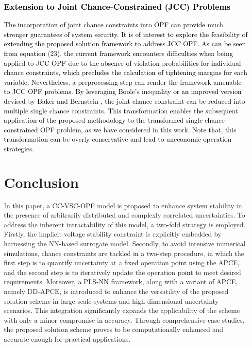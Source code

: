 \documentclass[journal]{IEEEtran}
\theoremstyle{definition}
\theoremstyle{remark}
\begin{document}
    \subsubsection{\textcolor{black}{Extension to Joint Chance-Constrained (JCC) Problems}}
    \textcolor{black}{The incorporation of joint chance constraints into OPF can provide much stronger guarantees of system security. It is of interest to explore the feasibility of extending the proposed solution framework to address JCC OPF. As can be seen from equation (23), the current framework encounters difficulties when being applied to JCC OPF due to the absence of violation probabilities for individual chance constraints, which precludes the calculation of tightening margins for each variable. Nevertheless, a preprocessing step can render the framework amenable to JCC OPF problems. By leveraging Boole's inequality \cite{boole_2009} or an improved version devised by Baker and Bernstein
 \cite{kyri2019joint}, the joint chance constraint can be reduced into multiple single chance constraints. This transformation enables the subsequent application of the proposed methodology to the transformed single chance-constrained OPF problem, as we have considered in this work. Note that, this transformation can be overly conservative and lead to uneconomic operation strategies.}
\section{Conclusion}\label{conclusion}
In this paper, a CC-VSC-OPF model is proposed to enhance system stability in the presence of arbitrarily distributed and complexly correlated uncertainties. To address the inherent intractability of this model, a two-fold strategy is employed. Firstly, the implicit voltage stability constraint is explicitly embedded by harnessing the NN-based surrogate model. Secondly, to avoid intensive numerical simulations, chance constraints are tackled in a two-step procedure, in which the first step is to \textcolor{black}{quantify} uncertainty at a fixed operation point using the APCE, and the second step is to iteratively update the operation point to meet desired requirements. Moreover, a PLS-NN framework, along with a variant of APCE, namely DD-APCE, is introduced to enhance the versatility of the proposed solution scheme in large-scale systems and high-dimensional uncertainty scenarios. This integration significantly expands the applicability of the scheme with only a minor compromise in accuracy. Through comprehensive case studies, the proposed solution scheme proves to be computationally enhanced and accurate enough for practical applications.
\end{document}

